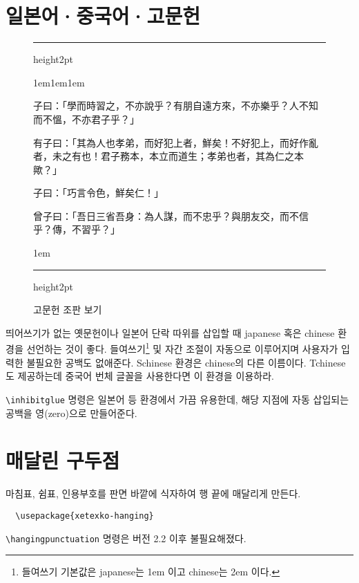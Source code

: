 \documentclass[a4paper]{article}
\def\grayhrule{{\color{white!80!black}\hrule height2pt}}
\def\grayvrule{{\color{white!80!black}\vrule width 2pt}}
\newenvironment{example}
  {\hbox\bgroup\grayvrule
    \vbox\bgroup\hsize\dimexpr\textwidth-4pt\relax
    \grayhrule\kern1em\leftskip1em\rightskip1em
  }{\par\kern1em\grayhrule\egroup\grayvrule\egroup}
\def\cs#1{\texttt{\textbackslash #1}}
\begin{document}
\section{일본어·중국어·고문헌}

\begin{figure}
  \begin{example}
    \chinese
子曰：「學而時習之，不亦說乎？有朋自遠方來，不亦樂乎？人不知而不慍，不亦君子乎？」

有子曰：「其為人也孝弟，而好犯上者，鮮矣！不好犯上，而好作亂者，未之有也！君子務本，本立而道生；孝弟也者，其為仁之本歟？」

子曰：「巧言令色，鮮矣仁！」

曾子曰：「吾日三省吾身：為人謀，而不忠乎？與朋友交，而不信乎？傳，不習乎？」
  \end{example}
\caption{고문헌 조판 보기}\label{fig:ancientdoc}
\end{figure}

띄어쓰기가 없는 옛문헌이나 일본어 단락 따위를 삽입할 때
japanese 혹은 chinese 환경을 선언하는 것이 좋다.
들여쓰기\footnote {들여쓰기 기본값은 japanese는 1em 이고 chinese는 2em 이다.}
및 자간 조절이 자동으로 이루어지며
사용자가 입력한 불필요한 공백도 없애준다.
Schinese 환경은 chinese의 다른 이름이다.
Tchinese도 제공하는데 중국어 번체 글꼴을 사용한다면 이 환경을 이용하라.

\cs{inhibitglue} 명령은 일본어 등 환경에서 가끔 유용한데,
해당 지점에 자동 삽입되는 공백을 영(zero)으로
만들어준다.

\section{매달린 구두점}
마침표, 쉼표, 인용부호를 판면 바깥에 식자하여 행 끝에 매달리게 만든다.
\begin{verbatim}
  \usepackage{xetexko-hanging}
\end{verbatim}
\cs{hangingpunctuation} 명령은 버전 2.2 이후 불필요해졌다.

\end{document}
